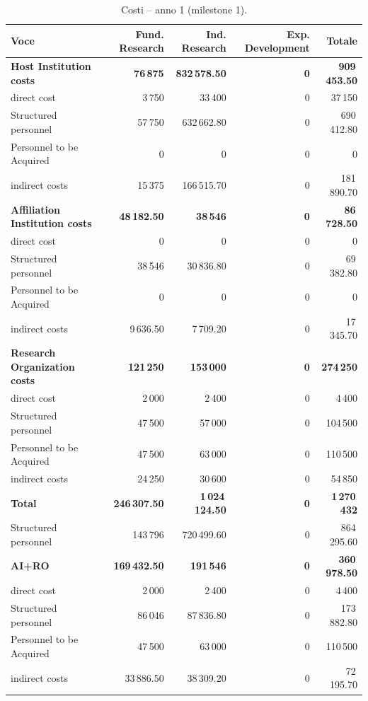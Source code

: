 \documentclass{plan4ari_report}
\begin{document}
\clearpage
\begin{table}[H]\centering\small
\caption{Costi -- anno 1 (milestone 1).}\label{tab:bpy-c-y1}
\begin{tabular}{lrrrr}\toprule
\textbf{Voce} & \textbf{Fund. Research} & \textbf{Ind. Research} & \textbf{Exp. Development} & \textbf{Totale} \\\midrule
\textbf{Host Institution costs} & \textbf{76\,875} & \textbf{832\,578.50} & \textbf{0} & \textbf{909\,453.50} \\
\quad direct cost & 3\,750 & 33\,400 & 0 & 37\,150 \\
\quad Structured personnel & 57\,750 & 632\,662.80 & 0 & 690\,412.80 \\
\quad Personnel to be Acquired & 0 & 0 & 0 & 0 \\
\quad indirect costs & 15\,375 & 166\,515.70 & 0 & 181\,890.70 \\
\textbf{Affiliation Institution costs} & \textbf{48\,182.50} & \textbf{38\,546} & \textbf{0} & \textbf{86\,728.50} \\
\quad direct cost & 0 & 0 & 0 & 0 \\
\quad Structured personnel & 38\,546 & 30\,836.80 & 0 & 69\,382.80 \\
\quad Personnel to be Acquired & 0 & 0 & 0 & 0 \\
\quad indirect costs & 9\,636.50 & 7\,709.20 & 0 & 17\,345.70 \\
\textbf{Research Organization costs} & \textbf{121\,250} & \textbf{153\,000} & \textbf{0} & \textbf{274\,250} \\
\quad direct cost & 2\,000 & 2\,400 & 0 & 4\,400 \\
\quad Structured personnel & 47\,500 & 57\,000 & 0 & 104\,500 \\
\quad Personnel to be Acquired & 47\,500 & 63\,000 & 0 & 110\,500 \\
\quad indirect costs & 24\,250 & 30\,600 & 0 & 54\,850 \\
\midrule
\textbf{Total} & \textbf{246\,307.50} & \textbf{1\,024\,124.50} & \textbf{0} & \textbf{1\,270\,432} \\
\quad Structured personnel & 143\,796 & 720\,499.60 & 0 & 864\,295.60 \\
\textbf{AI+RO} & \textbf{169\,432.50} & \textbf{191\,546} & \textbf{0} & \textbf{360\,978.50} \\
\quad direct cost & 2\,000 & 2\,400 & 0 & 4\,400 \\
\quad Structured personnel & 86\,046 & 87\,836.80 & 0 & 173\,882.80 \\
\quad Personnel to be Acquired & 47\,500 & 63\,000 & 0 & 110\,500 \\
\quad indirect costs & 33\,886.50 & 38\,309.20 & 0 & 72\,195.70 \\
\bottomrule\end{tabular}
\end{table}
\end{document}
